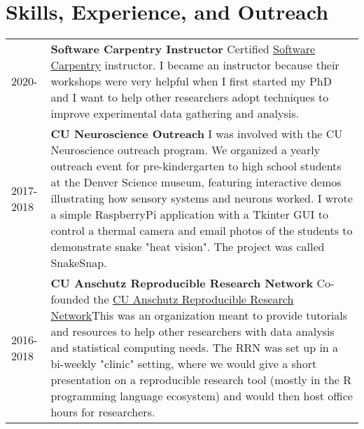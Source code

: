 \documentclass[11pt]{article}
\begin{document}
\section*{Skills, Experience, and Outreach}
\label{sec:orgf82d5df}
\begin{tabular}{lp{}}
2020-& \textbf{Software Carpentry Instructor} \newline Certified \href{https://software-carpentry.org/}{Software Carpentry} instructor. I became an instructor because their workshops were very helpful when I first started my PhD and I want to help other researchers adopt techniques to improve experimental data gathering and analysis.\\
2017-2018& \textbf{CU Neuroscience Outreach}\newline
I was involved with the CU Neuroscience outreach program. We organized a yearly outreach event for pre-kindergarten to high school students at the Denver Science museum, featuring interactive demos illustrating how sensory systems and neurons worked. I wrote a simple RaspberryPi application with a Tkinter GUI to control a thermal camera and email photos of the students to demonstrate snake "heat vision". The project was called SnakeSnap.\\
2016-2018& \textbf{CU Anschutz Reproducible Research Network} \newline Co-founded the \href{https://ucd-reproducible-research-clinic.github.io/members.html}{CU Anschutz Reproducible Research Network}\newline This was an organization meant to provide tutorials and resources to help other researchers with data analysis and statistical computing needs. The RRN was set up in a bi-weekly "clinic" setting, where we would give a short presentation on a reproducible research tool (mostly in the R programming language ecosystem) and would then host office hours for researchers.\\
\end{tabular}
\end{document}
